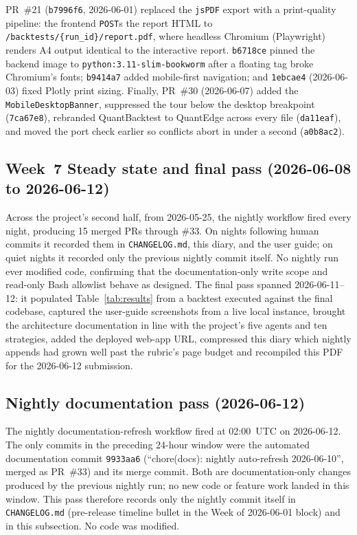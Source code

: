 PR~\#21 (\texttt{b7996f6}, 2026-06-01) replaced the \texttt{jsPDF} export with a
print-quality pipeline: the frontend \texttt{POST}s the report HTML to
\texttt{/backtests/\{run\_id\}/report.pdf}, where headless Chromium (Playwright)
renders A4 output identical to the interactive report. \texttt{b6718ce} pinned the
backend image to \texttt{python:3.11-slim-bookworm} after a floating tag broke
Chromium's fonts; \texttt{b9414a7} added mobile-first navigation; and
\texttt{1ebcae4} (2026-06-03) fixed Plotly print sizing. Finally, PR~\#30
(2026-06-07) added the \texttt{MobileDesktopBanner}, suppressed the tour below the
desktop breakpoint (\texttt{7ca67e8}), rebranded QuantBacktest to QuantEdge across
every file (\texttt{da11eaf}), and moved the port check earlier so conflicts abort
in under a second (\texttt{a0b8ac2}).

\subsection*{Week~7 \textemdash{} Steady state and final pass (2026-06-08 to 2026-06-12)}

Across the project's second half, from 2026-05-25, the nightly workflow fired
every night, producing 15 merged PRs through \#33. On nights following human
commits it recorded them in \texttt{CHANGELOG.md}, this diary, and the user
guide; on quiet nights it recorded only the previous nightly commit itself. No
nightly run ever modified code, confirming that the documentation-only write
scope and read-only Bash allowlist behave as designed. The final pass spanned
2026-06-11--12: it populated Table~\ref{tab:results} from a backtest executed
against the final codebase, captured the user-guide screenshots from a live local
instance, brought the architecture documentation in line with the project's five
agents and ten strategies, added the deployed web-app URL, compressed this diary
\textemdash{} which nightly appends had grown well past the rubric's page budget
\textemdash{} and recompiled this PDF for the 2026-06-12 submission.

\subsection*{Nightly documentation pass (2026-06-12)}

The nightly documentation-refresh workflow fired at 02:00~UTC on 2026-06-12. The only
commits in the preceding 24-hour window were the automated documentation commit
\texttt{9933aa6} (``chore(docs): nightly auto-refresh 2026-06-10'', merged as PR~\#33)
and its merge commit. Both are documentation-only changes produced by the previous
nightly run; no new code or feature work landed in this window. This pass therefore
records only the nightly commit itself in \texttt{CHANGELOG.md} (pre-release timeline
bullet in the Week of 2026-06-01 block) and in this subsection. No code was modified.

